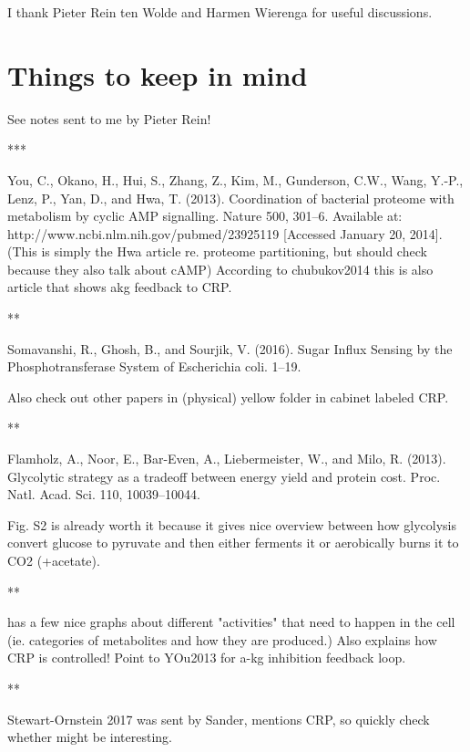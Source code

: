 I thank Pieter Rein ten Wolde and Harmen Wierenga for useful discussions.


\section*{Things to keep in mind}

See notes sent to me by Pieter Rein!

***

\cite{You2013}
You, C., Okano, H., Hui, S., Zhang, Z., Kim, M., Gunderson, C.W., Wang, Y.-P., Lenz, P., Yan, D., and Hwa, T. (2013). Coordination of bacterial proteome with metabolism by cyclic AMP signalling. Nature 500, 301–6. Available at: http://www.ncbi.nlm.nih.gov/pubmed/23925119 [Accessed January 20, 2014].
(This is simply the Hwa article re. proteome partitioning, but should check because they also talk about cAMP)
According to chubukov2014 this is also article that shows akg feedback to CRP.

**

\cite{Somavanshi2016}
Somavanshi, R., Ghosh, B., and Sourjik, V. (2016). Sugar Influx Sensing by the Phosphotransferase System of Escherichia coli. 1–19.

Also check out other papers in (physical) yellow folder in cabinet labeled CRP.

**

\cite{Flamholz2013}
Flamholz, A., Noor, E., Bar-Even, A., Liebermeister, W., and Milo, R. (2013). Glycolytic strategy as a tradeoff between energy yield and protein cost. Proc. Natl. Acad. Sci. 110, 10039–10044.

Fig. S2 is already worth it because it gives nice overview between how glycolysis convert glucose to pyruvate and then either ferments it or aerobically burns it to CO2 (+acetate).

**

\cite{chubukov2014} has a few nice graphs about different "activities" that need to happen in the cell (ie. categories of metabolites and how they are produced.) Also explains how CRP is controlled! Point to YOu2013 for a-kg inhibition feedback loop.

**

Stewart-Ornstein 2017 \cite{Stewart-Ornstein2017} was sent by Sander, mentions CRP, so quickly check whether might be interesting.

